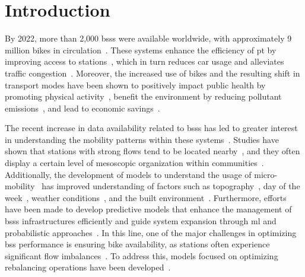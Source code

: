\section{Introduction}

By 2022, more than 2,000 \acp{bss} were available worldwide, with approximately 9 million bikes in circulation~\cite{MeddinWorldMap2025}. These systems enhance the efficiency of \ac{pt} by improving access to stations~\cite{Noland2019, Kapuku2021}, which in turn reduces car usage and alleviates traffic congestion~\cite{Ma2020, Fan2020}. Moreover, the increased use of bikes and the resulting shift in transport modes have been shown to positively impact public health by promoting physical activity~\cite{Otero2018}, benefit the environment by reducing pollutant emissions~\cite{Clockston2021}, and lead to economic savings~\cite{Ricci2015}.

The recent increase in data availability related to \acp{bss} has led to greater interest in understanding the mobility patterns within these systems~\cite{Kou2019, Li2020}. Studies have shown that stations with strong flows tend to be located nearby~\cite{Chen2017}, and they often display a certain level of mesoscopic organization within communities~\cite{Zaltz2013}. Additionally, the development of models to understand the usage of micro-mobility~\cite{Tran2015} has improved understanding of factors such as topography~\cite{Kim2020}, day of the week~\cite{Tran2015}, weather conditions~\cite{ElAssi2017, Kim2018, Ashqar2019}, and the built environment~\cite{Tran2015}. Furthermore, efforts have been made to develop predictive models that enhance the management of \acp{bss} infrastructures efficiently and guide system expansion through \ac{ml} and probabilistic approaches~\cite{Singhvi2015, Li2015, Chen2016, Albuquerque2021, Yang2020graph, Almannaa2020}. In this line, one of the major challenges in optimizing \ac{bss} performance is ensuring bike availability, as stations often experience significant flow imbalances~\cite{Yang2016, Singla2015, FaghihImani2017Empirical}. To address this, models focused on optimizing rebalancing operations have been developed~\cite{Raviv2013, DellAmico2014, Dell2018, Chiariotti2018}.

